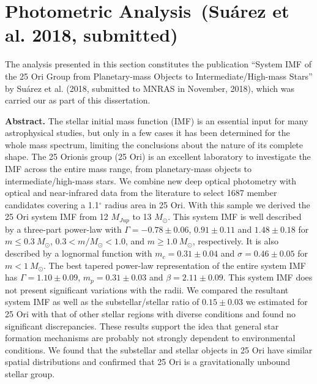 \documentclass[12pt]{article}
\begin{document}


\newpage
\section[Photometric Analysis]{Photometric Analysis\ (Su\'arez et al. 2018, submitted)}
\label{sec:photometry}
The analysis presented in this section constitutes the publication ``System IMF of the 25 Ori Group from Planetary-mass Objects to Intermediate/High-mass Stars'' by Su\'arez et al. (2018, submitted to MNRAS in November, 2018), which was carried our as part of this dissertation.


{\bf Abstract.}
The stellar initial mass function (IMF) is an essential input for many astrophysical studies, but only in a few cases it has been determined for the whole mass spectrum, limiting the conclusions about the nature of its complete shape. The 25 Orionis group (25 Ori) is an excellent laboratory to investigate the IMF across the entire mass range, from planetary-mass objects to intermediate/high-mass stars. We combine new deep optical photometry with optical and near-infrared data from the literature to select 1687 member candidates covering a 1.1$^\circ$ radius area in 25 Ori. With this sample we derived the 25 Ori system IMF from 12 $M_{Jup}$ to 13 $M_\odot$. This system IMF is well described by a three-part power-law with $\Gamma=-0.78\pm0.06$, $0.91\pm0.11$ and $1.48\pm0.18$ for $m\le0.3\ M_\odot$, $0.3< m/M_\odot<1.0$, and $m\ge1.0\ M_\odot$, respectively. It is also described by a lognormal function with $m_c=0.31\pm0.04$ and $\sigma=0.46\pm0.05$ for $m<1\ M_\odot$. The best tapered power-law representation of the entire system IMF has $\Gamma=1.10\pm0.09$, $m_p=0.31\pm0.03$ and $\beta=2.11\pm0.09$. This system IMF does not present significant variations with the radii. We compared the resultant system IMF as well as the substellar/stellar ratio of $0.15\pm0.03$ we estimated for 25 Ori with that of other stellar regions with diverse conditions and found no significant discrepancies. These results support the idea that general star formation mechanisms are probably not strongly dependent to environmental conditions. We found that the substellar and stellar objects in 25 Ori have similar spatial distributions and confirmed that 25 Ori is a gravitationally unbound stellar group.
\end{document}
